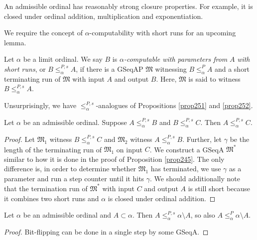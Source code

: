 \documentclass[12pt]{article}
\numberwithin{equation}{section}
\begin{document}
An admissible ordinal has reasonably strong closure properties. For example, it is closed under ordinal addition, multiplication and exponentiation.

We require the concept of $\alpha$-computability with short runs for an upcoming lemma.

\begin{defi}\label{def269p}
Let $\alpha$ be a limit ordinal. We say $B$ is $\alpha$\emph{-computable with parameters from} $A$ \emph{with short runs}, or $B \leq^{P, s}_{\alpha} A$, if there is a GSeqAP $\mathfrak{M}$ witnessing $B \leq^P_{\alpha} A$ and a short terminating run of $\mathfrak{M}$ with input $A$ and output $B$. Here, $\mathfrak{M}$ is said to witness $B \leq^{P, s}_{\alpha} A$.
\end{defi}

Unsurprisingly, we have $\leq^{P, s}_{\alpha}$-analogues of Propositions \ref{prop251} and \ref{prop252}.

\begin{prop}\label{prop270n}
Let $\alpha$ be an admissible ordinal. Suppose $A \leq^{P, s}_{\alpha} B$ and $B \leq^{P, s}_{\alpha} C$. Then $A \leq^{P, s}_{\alpha} C$.
\end{prop}

\begin{proof}
Let $\mathfrak{M}_1$ witness $B \leq^{P, s}_{\alpha} C$ and $\mathfrak{M}_2$ witness $A \leq^{P, s}_{\alpha} B$. Further, let $\gamma$ be the length of the terminating run of $\mathfrak{M}_1$ on input $C$. We construct a GSeqA $\mathfrak{M}^*$ similar to how it is done in the proof of Proposition \ref{prop245}. The only difference is, in order to determine whether $\mathfrak{M}_1$ has terminated, we use $\gamma$ as a parameter and run a step counter until it hits $\gamma$. We should additionally note that the termination run of $\mathfrak{M}^*$ with input $C$ and output $A$ is still short because it combines two short runs and $\alpha$ is closed under ordinal addition.
\end{proof}

\begin{prop}\label{prop270o}
Let $\alpha$ be an admissible ordinal and $A \subset \alpha$. Then $A \leq^{P, s}_{\alpha} \alpha \setminus A$, so also $A \leq^{P}_{\alpha} \alpha \setminus A$.
\end{prop}

\begin{proof}
Bit-flipping can be done in a single step by some GSeqA.
\end{proof}
\end{document}
